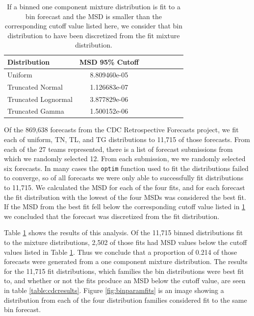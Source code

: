 \documentclass[11pt,notitlepage]{isuthesis}
\begin{document}
\begin{table}[h!]
  \centering
  \begin{tabular}{l*{6}{c}r}
  Distribution          & MSD 95\% Cutoff \\
  \hline
  Uniform               & 8.809460e-05   \\
  Truncated Normal      & 1.126683e-07  \\
  Truncated Lognormal   & 3.877829e-06  \\
  Truncated Gamma       & 1.500152e-06  \\
  \end{tabular}
  \begin{center}
\begin{minipage}{10cm}
\captionsetup{font=scriptsize}
  \caption[Bin distribution cutoff values]{If a binned 
  one component mixture distribution is fit to a bin forecast
  and the MSD is smaller than
  the corresponding cutoff value listed here, we consider that bin 
  distribution to have been discretized from the fit mixture distribution.}
  \label{table:bincutoffs}
  \end{minipage}
  \end{center}
\end{table}




Of the 869,638 forecasts from the CDC Retrospective Forecasts project, we fit
each of uniform, TN, TL, and TG distributions to 11,715 of those
forecasts. From each of the 27 teams represented, there is a list of forecast
submissions from which we randomly selected 12. From each submission, we 
we randomly selected six forecasts.
In many cases the \texttt{optim} function used to fit the 
distributions failed to converge, so of all forecasts we were only able to 
successfully fit distributions to 11,715.
We calculated the MSD for each of the four fits, and for each forecast the fit
distribution with the lowest of the four MSDs was considered the best fit. If 
the MSD from the best fit fell
below the corresponding cutoff value listed in \ref{table:bincutoffs} we 
concluded that 
the forecast was discretized from the fit distribution. 

Table \ref{table:bincutoffs} shows the results of this analysis. 
Of the 11,715 binned distributions fit to the mixture distributions,
2,502 of those fits had MSD values below the cutoff values listed in Table
\ref{table:bincutoffs}. Thus we conclude that a proportion of 0.214 of those
forecasts were generated from a one component mixture distribution. 
The results for 
the
11,715 fit distributions, which families the bin distributions were best
fit to, and whether or not the fits produce an MSD below the cutoff value, 
are seen in table \ref{table:cdcresults}. Figure \ref{fig:binparamfits} is an
image showing a distribution from each of the four distribution families 
considered
fit to the same bin forecast.
\end{document}
